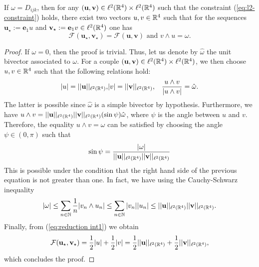 \begin{proposition}
\label{prop:simple reduction}
If $\omega = D_{ijk}$, then for any $(\mathbf{u}, \mathbf{v}) \in \ell^2(\mathbb{R}^4) \times \ell^2(\mathbb{R}^4)$ such that the constraint (\ref{eq:l2-constraint}) holds, there exist two vectors $u, v \in \mathbb{R}^4$ such that for the sequences $\mathbf{u_\star} := \mathbf{e}_1 u$ and $\mathbf{v_\star} := \mathbf{e}_1 v \in \ell^2(\mathbb{R}^4)$ one has
\begin{equation}
\mathcal{F}(\mathbf{u_{\star}}, \mathbf{v_{\star}}) = \mathcal{F}(\mathbf{u}, \mathbf{v}) \text{ and } v \wedge u = \omega.
\end{equation}
\end{proposition}

\begin{proof}
If $\omega = 0$, then the proof is trivial. Thus, let us denote by $\hat{\omega}$ the unit bivector associated to $\omega$. For a couple $(\mathbf{u}, \mathbf{v}) \in \ell^2(\mathbb{R}^4) \times \ell^2(\mathbb{R}^4)$, we then choose $u,v \in \mathbb{R}^4$ such that the following relations hold:
\begin{eqnarray}
\label{eq:reduction int1}
	|u| = ||\mathbf{u} ||_{\ell^2(\mathbb{R}^4)}, &  |v| = ||\mathbf{v} ||_{\ell^2(\mathbb{R}^4)} , & \frac{u \wedge v}{|u \wedge v|} = \hat{\omega}.
\end{eqnarray}
The latter is possible since $\hat{\omega}$ is a simple bivector by hypothesis. Furthermore, we have $u \wedge v = ||\mathbf{u}||_{\ell^2(\mathbb{R}^4)} ||\mathbf{v}||_{\ell^2(\mathbb{R}^4)} (\sin\psi)\hat{\omega}$, where $\psi$ is the angle between $u$ and $v$. Therefore, the equality $u \wedge v = \omega$ can be satisfied by choosing the angle $\psi \in (0, \pi)$ such that
\begin{equation}
 \sin \psi = \frac{|\omega|}{||\mathbf{u}||_{\ell^2(\mathbb{R}^4)} ||\mathbf{v} ||_{\ell^2(\mathbb{R}^4)}}
 \end{equation}
This is possible under the condition that the right hand side  of the previous equation is not greater than one. In fact, we have using the Cauchy-Schwarz inequality
\begin{equation}
|\omega| \leq \sum_{n \in \mathbb{N}} \frac{1}{n} |v_n \wedge u_n| \leq \sum_{n \in \mathbb{N}} |v_n| |u_n| \leq ||\mathbf{u} ||_{\ell^2(\mathbb{R}^4)} ||\mathbf{v} ||_{\ell^2(\mathbb{R}^4)}.
\end{equation}
Finally, from (\ref{eq:reduction int1}) we obtain
\begin{equation}
\mathcal{F}(\mathbf{u_\star}, \mathbf{v_{\star}}) = \frac{1}{2} |u| + \frac{1}{2} |v| = \frac{1}{2} ||\mathbf{u}||_{\ell^2(\mathbb{R}^4)} + \frac{1}{2} ||\textbf{v}||_{\ell^2(\mathbb{R}^4)},
\end{equation}
which concludes the proof.
\end{proof}

